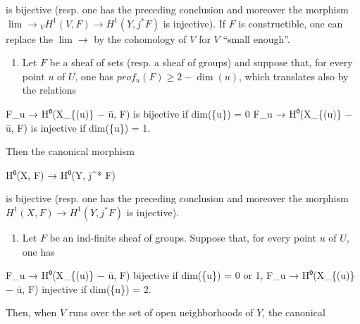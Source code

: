 \documentclass[
  11pt,
  a4paper,
]{book}
\newenvironment{Shaded}{}{}
\newcommand{\NormalTok}[1]{#1}
\providecommand{\tightlist}{%
  \setlength{\itemsep}{0pt}\setlength{\parskip}{0pt}}
\begin{document}
is bijective (resp. one has the preceding conclusion and moreover the
morphism \(\lim \to {}_{V} H^{1}(V, F) \to H^{1}(Y,
j^{*} F)\) is injective). If \(F\) is constructible, one can replace the
\(\lim \to\) by the cohomology of \(V\) for \(V\) ``small enough''.

\begin{enumerate}
\def\labelenumi{\alph{enumi})}
\setcounter{enumi}{1}
\tightlist
\item
  Let \(F\) be a sheaf of sets (resp. a sheaf of groups) and suppose
  that, for every point \(u\) of \(U\), one has
  \(prof_{u}(F) \geqslant 2 - \dim({u})\), which translates also by the
  relations
\end{enumerate}

\begin{Shaded}
\begin{Highlighting}[]
\NormalTok{F\_u → H⁰(X\_\{(u)\} − ū, F) is bijective if dim(\{u\}) = 0}
\NormalTok{F\_u → H⁰(X\_\{(u)\} − ū, F) is injective if dim(\{u\}) = 1.}
\end{Highlighting}
\end{Shaded}

Then the canonical morphism

\begin{Shaded}
\begin{Highlighting}[]
\NormalTok{H⁰(X, F) → H⁰(Y, j\^{}* F)}
\end{Highlighting}
\end{Shaded}

is bijective (resp. one has the preceding conclusion and moreover the
morphism \(H^{1}(X, F) \to H^{1}(Y, j^{*} F)\) is injective).

\begin{enumerate}
\def\labelenumi{\alph{enumi})}
\setcounter{enumi}{2}
\tightlist
\item
  Let \(F\) be an ind-finite sheaf of groups. Suppose that, for every
  point \(u\) of \(U\), one has
\end{enumerate}

\begin{Shaded}
\begin{Highlighting}[]
\NormalTok{F\_u → H⁰(X\_\{(u)\} − ū, F) bijective if dim(\{u\}) = 0 or 1,}
\NormalTok{F\_u → H⁰(X\_\{(u)\} − ū, F) injective if dim(\{u\}) = 2.}
\end{Highlighting}
\end{Shaded}

Then, when \(V\) runs over the set of open neighborhoods of \(Y\), the
canonical
\end{document}

